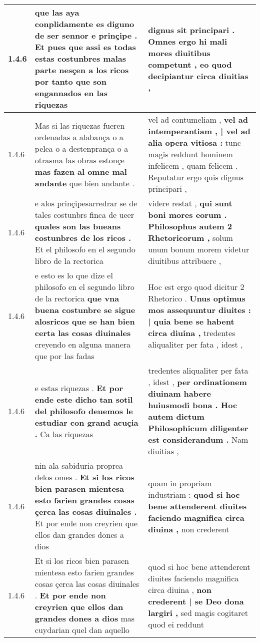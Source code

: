 \begin{tabular}{|p{1cm}|p{6.5cm}|p{6.5cm}|}
1.4.6 & que las aya conplidamente es diguno de ser sennor e prinçipe . \textbf{ Et pues que assi es todas estas costunbres malas parte nesçen a los ricos } por tanto que son engannados en las riquezas & dignus sit principari . \textbf{ Omnes ergo hi mali mores diuitibus competunt , } eo quod decipiantur circa diuitias , \\\hline
1.4.6 & Mas si las riquezas fueren ordenadas a alabança o a pelea o a destenprança o a otrasma las obras estonçe \textbf{ mas fazen al omne mal andante } que bien andante . & vel ad contumeliam , \textbf{ vel ad intemperantiam , | vel ad alia opera vitiosa : } tunc magis reddunt hominem infelicem , quam felicem . Reputatur ergo quis dignus principari , \\\hline
1.4.6 & e alos prinçipesarredrar se de tales costunbrs finca de ueer \textbf{ quales son las bueans costunbres de los ricos . } Et el philosofo en el segundo libro de la rectorica & videre restat , \textbf{ qui sunt boni mores eorum . Philosophus autem 2 Rhetoricorum , } solum unum bonum morem videtur diuitibus attribuere , \\\hline
1.4.6 & e esto es lo que dize el philosofo en el segundo libro de la rectorica \textbf{ que vna buena costunbre se sigue alosricos que se han bien certa las cosas diuinales } creyendo en alguna manera que por las fadas & Hoc est ergo quod dicitur 2 Rhetorico . \textbf{ Unus optimus mos assequuntur diuites : | quia bene se habent circa diuina , } tredentes aliqualiter per fata , idest , \\\hline
1.4.6 & e estas riquezas . \textbf{ Et por ende este dicho tan sotil del philosofo deuemos le estudiar con grand acuçia . } Ca las riquezas & tredentes aliqualiter per fata , idest , \textbf{ per ordinationem diuinam habere huiusmodi bona . Hoc autem dictum Philosophicum diligenter est considerandum . } Nam diuitias , \\\hline
1.4.6 & nin ala sabiduria proprea delos omes . \textbf{ Et si los ricos bien parasen mientesa esto farien grandes cosas çerca las cosas diuinales . } Et por ende non creyrien que ellos dan grandes dones a dios & quam in propriam industriam : \textbf{ quod si hoc bene attenderent diuites faciendo magnifica circa diuina , } non crederent \\\hline
1.4.6 & Et si los ricos bien parasen mientesa esto farien grandes cosas çerca las cosas diuinales . \textbf{ Et por ende non creyrien que ellos dan grandes dones a dios } mas cuydarian quel dan aquello & quod si hoc bene attenderent diuites faciendo magnifica circa diuina , \textbf{ non crederent | se Deo dona largiri , } sed magis cogitaret quod ei reddunt \\\hline

\end{tabular}
